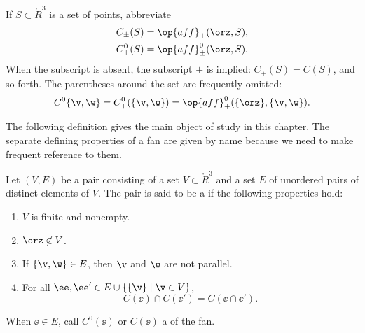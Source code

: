 

If $S\subset\ring{R}^3$ is a set of points,
abbreviate
\begin{align*}
C_\pm(S) &= \op{aff}_\pm(\orz,S),\\
C^0_\pm(S) &= \op{aff}^0_\pm(\orz,S).\\
\end{align*}
When the subscript is absent, the subscript $+$ is implied: $C_+(S)
= C(S)$, and so forth.  The parentheses around the set are frequently
omitted:
\[ C^0\{\v,\w\}=C^0_+(\{\v,\w\}) =
\op{aff}^0_+(\{\orz\},\{\v,\w\}).\] 

The following definition gives the main object of study in this chapter.  The separate
defining properties of a fan are given by name because we need to make frequent
reference to them.

\begin{definition}
Let $(V,E)$ be a pair consisting of a set $V\subset \ring{R}^3$ and
a set $E$ of unordered pairs of distinct elements of $V$.  The pair
is said to be a  if the following properties hold:
\begin{enumerate}
\item {} $V$ is finite and  nonempty.
\item {} $\orz\not\in V$.
\item {} If $\{\v,\w\} \in E$, then $\v$ and $\w$
are not parallel.
\item {}
For all $\ee ,\ee '\in E \cup \{\{\v\}\mid \v\in V\}$, 
\[ C(\ee )\cap C(\ee ') = C(\ee \cap \ee
').\] 
\end{enumerate}
When $\ee\in E$, call $C^0(\ee)$ or $C(\ee)$ a 
of the fan.
\end{definition}
%
%



